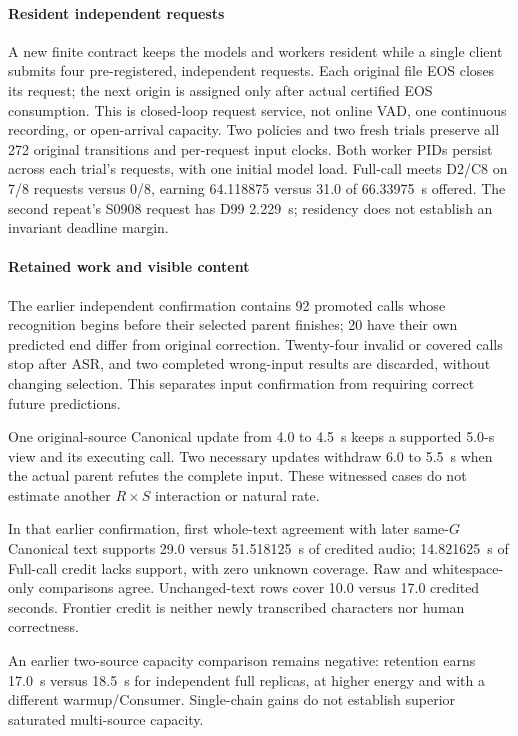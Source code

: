 \paragraph{Resident independent requests}
A new finite contract keeps the models and workers resident while a
single client submits four pre-registered, independent requests. Each
original file EOS closes its request; the next origin is assigned only
after actual certified EOS consumption. This is closed-loop request
service, not online VAD, one continuous recording, or open-arrival
capacity. Two policies and two fresh trials preserve all 272 original
transitions and per-request input clocks. Both worker PIDs persist across
each trial's requests, with one initial model load. Full-call meets D2/C8
on 7/8 requests versus 0/8, earning 64.118875 versus 31.0 of 66.33975~s
offered. The second repeat's S0908 request has D99 2.229~s; residency
does not establish an invariant deadline margin.

\paragraph{Retained work and visible content}
The earlier independent confirmation contains 92 promoted calls whose
recognition begins before their selected parent finishes; 20 have their
own predicted end differ from original correction. Twenty-four invalid
or covered calls stop after ASR, and two completed wrong-input results
are discarded, without changing selection. This separates input
confirmation from requiring correct future predictions.

One original-source Canonical update from 4.0 to 4.5~s keeps a supported
5.0-s view and its executing call. Two necessary updates withdraw 6.0 to
5.5~s when the actual parent refutes the complete input. These witnessed
cases do not estimate another $R\times S$ interaction or natural rate.

In that earlier confirmation, first whole-text agreement with later
same-$G$ Canonical text supports 29.0 versus 51.518125~s of credited audio;
14.821625~s of Full-call credit lacks support, with zero unknown coverage.
Raw and whitespace-only comparisons agree. Unchanged-text rows cover
10.0 versus 17.0 credited seconds. Frontier credit is neither newly
transcribed characters nor human correctness.

An earlier two-source capacity comparison remains negative: retention
earns 17.0~s versus 18.5~s for independent full replicas, at higher energy
and with a different warmup/Consumer. Single-chain gains do not establish
superior saturated multi-source capacity.
